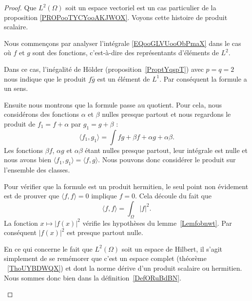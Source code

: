 \begin{proof}
	Que \( L^2(\Omega)\) soit un espace vectoriel est un cas particulier de la proposition \ref{PROPooTYCYooAKJWOX}. Voyons cette histoire de produit scalaire.

	\begin{subproof}
		Nous commençons par analyser l'intégrale \eqref{EQooGLVUooObPmaX} dans le cas où \( f\) et \( g\) sont des fonctions, c'est-à-dire des représentants d'éléments de \( L^2\).

		Dans ce cas, l'inégalité de Hölder (proposition~\ref{ProptYqspT}) avec \( p=q=2\) nous indique que le produit \( f\bar g\) est un élément de \( L^1\). Par conséquent la formule a un sens.


		Ensuite nous montrons que la formule passe au quotient. Pour cela, nous considérons des fonctions \( \alpha\) et \( \beta\) nulles presque partout et nous regardons le produit de \( f_1=f+\alpha\) par \( g_1=g+\beta\) :
		\begin{equation}
			\langle f_1, g_1\rangle =\int fg+\beta f+\alpha g+ \alpha\beta.
		\end{equation}
		Les fonctions \( \beta f\), \( \alpha g\) et \( \alpha\beta\) étant nulles presque partout, leur intégrale est nulle et nous avons bien \( \langle f_1, g_1\rangle =\langle f,g \rangle \). Nous pouvons donc considérer le produit sur l'ensemble des classes.

		Pour vérifier que la formule est un produit hermitien, le seul point non évidement est de prouver que \( \langle f, f\rangle =0\) implique \( f=0\). Cela découle du fait que
		\begin{equation}
			\langle f, f\rangle =\int_{\Omega}| f |^2.
		\end{equation}
		La fonction \( x\mapsto | f(x) |^2\) vérifie les hypothèses du lemme~\ref{Lemfobnwt}. Par conséquent \( | f(x) |^2\) est presque partout nulle.

		En ce qui concerne le fait que \( L^2(\Omega)\) soit un espace de Hilbert, il s'agit simplement de se remémorer que c'est un espace complet (théorème ~\ref{ThoUYBDWQX}) et dont la norme dérive d'un produit scalaire ou hermitien. Nous sommes donc bien dans la définition~\ref{DefORuBdBN}.
	\end{subproof}
\end{proof}

